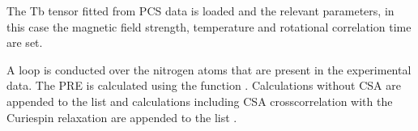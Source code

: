 \documentclass[a4paper,10pt,english,openany,oneside]{sphinxmanual}
\begin{document}
\begin{sphinxVerbatim}[commandchars=\\\{\}]
     

  

  

  
\end{sphinxVerbatim}

\sphinxAtStartPar
The Tb tensor fitted from PCS data is loaded and the relevant parameters, in this case the magnetic field strength, temperature and rotational correlation time are set.

\begin{sphinxVerbatim}[commandchars=\\\{\}]
  
  
  
  
\end{sphinxVerbatim}

\sphinxAtStartPar
A loop is conducted over the nitrogen atoms that are present in the experimental data. The PRE is calculated using the function . Calculations without CSA are appended to the list  and calculations including CSA cross\sphinxhyphen{}correlation with the Curie\sphinxhyphen{}spin relaxation are appended to the list .
\end{document}
